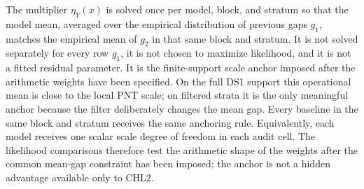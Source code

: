 \documentclass[10pt]{article}
\begin{document}
The multiplier $\eta_Y(x)$ is solved once per model, block, and stratum so that the model mean, averaged over the empirical distribution of previous gaps $g_1$, matches the empirical mean of $g_2$ in that same block and stratum.  It is not solved separately for every row $g_1$, it is not chosen to maximize likelihood, and it is not a fitted residual parameter.  It is the finite-support scale anchor imposed after the arithmetic weights have been specified.  On the full DS1 support this operational mean is close to the local PNT scale; on filtered strata it is the only meaningful anchor because the filter deliberately changes the mean gap.  Every baseline in the same block and stratum receives the same anchoring rule.  Equivalently, each model receives one scalar scale degree of freedom in each audit cell.  The likelihood comparisons therefore test the arithmetic shape of the weights after the common mean-gap constraint has been imposed; the anchor is not a hidden advantage available only to CHL2.
\end{document}

